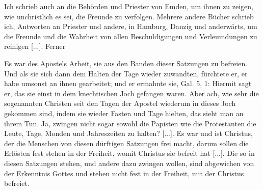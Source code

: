 Ich schrieb auch an die Behörden und Priester von Emden,
um ihnen zu zeigen, wie unchristlich es sei, die Freunde zu 
verfolgen. Mehrere andere Bücher schrieb ich, Antworten an Priester
und andere, in Hamburg, Danzig und 
anderwärts, um die Freunde
und die Wahrheit von allen Beschuldigungen und Verleumdungen
zu reinigen [...]. Ferner 


Es war des Apostels Arbeit, sie aus den Banden dieser
Satzungen zu befreien. Und als sie sich dann dem Halten der
Tage wieder zuwandten, fürchtete er, er habe umsonst an ihnen
gearbeitet; und er ermahnte sie, Gal. 5, 1: 
 Hiermit sagt
er, das sie einst in dem knechtischen Joch gefangen waren. Aber
ach, wie sehr die sogenannten Christen seit den Tagen der Apostel
wiederum in dieses Joch gekommen sind, indem sie wieder Fasten
und Tage hielten, das sieht man an ihrem Tun. Ja, zwingen
nicht sogar sowohl die Papisten wie die 
Protestanten die Leute,
Tage, Monden und Jahreszeiten zu halten? [...]. Es war und
ist Christus, der die Menschen von diesen dürftigen Satzungen frei
macht, darum sollen die Erlösten fest stehen in der Freiheit, womit
Christus sie befreit hat [...]. Die so in diesen Satzungen stehen, und
andere dazu zwingen wollen, sind abgewichen von der Erkenntnis
Gottes und stehen nicht fest in der Freiheit, mit der Christus befreiet.

